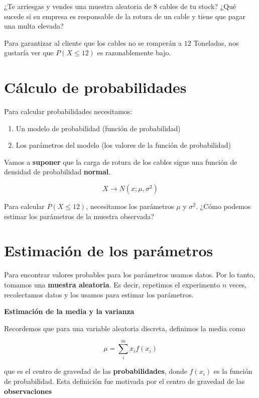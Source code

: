 \documentclass[
]{book}
\begin{document}
¿Te arriesgas y vendes una muestra aleatoria de \(8\) cables de tu stock? ¿Qué sucede si su empresa es responsable de la rotura de un cable y tiene que pagar una multa elevada?

Para garantizar al cliente que los cables no se romperán a \(12\) Toneladas, nos gustaría ver que \(P(X \leq 12)\) es razonablemente bajo.

\hypertarget{cuxe1lculo-de-probabilidades}{%
\section{Cálculo de probabilidades}\label{cuxe1lculo-de-probabilidades}}

Para calcular probabilidades necesitamos:

\begin{enumerate}
\def\labelenumi{\arabic{enumi}.}
\item
  Un modelo de probabilidad (función de probabilidad)
\item
  Los parámetros del modelo (los valores de la función de probabilidad)
\end{enumerate}

Vamos a \textbf{suponer} que la carga de rotura de los cables sigue una función de densidad de probabilidad \textbf{normal}.

\[X \rightarrow N(x; \mu, \sigma^2)\]

Para calcular \(P(X \leq 12)\), necesitamos los parámetros \(\mu\) y \(\sigma^2\). ¿Cómo podemos estimar los parámetros de la muestra observada?

\hypertarget{estimaciuxf3n-de-los-paruxe1metros}{%
\section{Estimación de los parámetros}\label{estimaciuxf3n-de-los-paruxe1metros}}

Para encontrar valores probables para los parámetros usamos datos. Por lo tanto, tomamos una \textbf{muestra aleatoria}. Es decir, repetimos el experimento \(n\) veces, recolectamos datos y los usamos para estimar los parámetros.

\textbf{Estimación de la media y la varianza}

Recordemos que para una variable aleatoria discreta, definimos la media como

\[\mu=\sum_{i}^m x_if(x_i)\]

que es el centro de gravedad de las \textbf{probabilidades}, donde \(f(x_i)\) es la función de probabilidad. Esta definición fue motivada por el centro de gravedad de las \textbf{observaciones}
\end{document}

